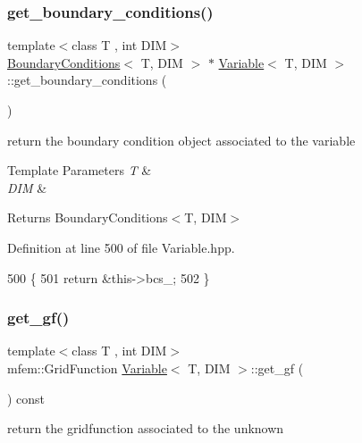 \subsubsection{\texorpdfstring{get\+\_\+boundary\+\_\+conditions()}{get\_boundary\_conditions()}}
{\footnotesize\ttfamily template$<$class T , int D\+IM$>$ \\
\hyperlink{classBoundaryConditions}{Boundary\+Conditions}$<$ T, D\+IM $>$ $\ast$ \hyperlink{classVariable}{Variable}$<$ T, D\+IM $>$\+::get\+\_\+boundary\+\_\+conditions (\begin{DoxyParamCaption}{ }\end{DoxyParamCaption})}



return the boundary condition object associated to the variable 


\begin{DoxyTemplParams}{Template Parameters}
{\em T} & \\
\hline
{\em D\+IM} & \\
\hline
\end{DoxyTemplParams}
\begin{DoxyReturn}{Returns}
Boundary\+Conditions$<$\+T, D\+I\+M$>$ 
\end{DoxyReturn}


Definition at line 500 of file Variable.\+hpp.


\begin{DoxyCode}
500                                                                       \{
501   \textcolor{keywordflow}{return} &this->bcs\_;
502 \}
\end{DoxyCode}
\mbox{\label{classVariable_a19c2d3361e85a75225052d3fc12c641b}} 
\subsubsection{\texorpdfstring{get\+\_\+gf()}{get\_gf()}}
{\footnotesize\ttfamily template$<$class T , int D\+IM$>$ \\
mfem\+::\+Grid\+Function \hyperlink{classVariable}{Variable}$<$ T, D\+IM $>$\+::get\+\_\+gf (\begin{DoxyParamCaption}{ }\end{DoxyParamCaption}) const}



return the gridfunction associated to the unknown 

